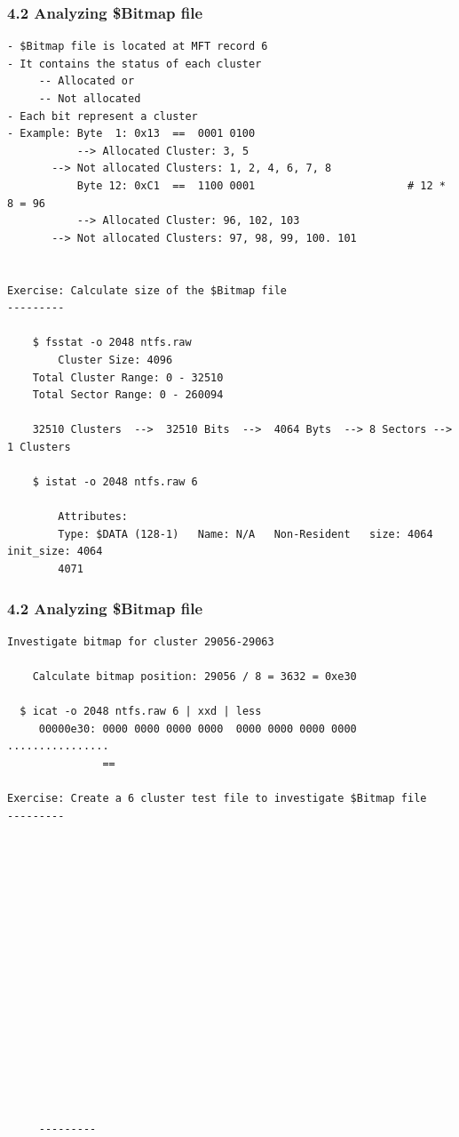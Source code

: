 \begin{frame}[fragile]
  \frametitle{4.2 Analyzing \$Bitmap file}
  \begin{lstlisting}[basicstyle=\tiny]
- $Bitmap file is located at MFT record 6
- It contains the status of each cluster
     -- Allocated or
     -- Not allocated
- Each bit represent a cluster
- Example: Byte  1: 0x13  ==  0001 0100 
           --> Allocated Cluster: 3, 5
	   --> Not allocated Clusters: 1, 2, 4, 6, 7, 8
           Byte 12: 0xC1  ==  1100 0001                        # 12 * 8 = 96
           --> Allocated Cluster: 96, 102, 103
	   --> Not allocated Clusters: 97, 98, 99, 100. 101


Exercise: Calculate size of the $Bitmap file
---------

    $ fsstat -o 2048 ntfs.raw
        Cluster Size: 4096
	Total Cluster Range: 0 - 32510
	Total Sector Range: 0 - 260094

    32510 Clusters  -->  32510 Bits  -->  4064 Byts  --> 8 Sectors --> 1 Clusters

    $ istat -o 2048 ntfs.raw 6

        Attributes:
        Type: $DATA (128-1)   Name: N/A   Non-Resident   size: 4064  init_size: 4064
        4071
  \end{lstlisting}
\end{frame}


\begin{frame}[fragile]
  \frametitle{4.2 Analyzing \$Bitmap file}
  \begin{lstlisting}[basicstyle=\tiny]
Investigate bitmap for cluster 29056-29063

    Calculate bitmap position: 29056 / 8 = 3632 = 0xe30
  
  $ icat -o 2048 ntfs.raw 6 | xxd | less
     00000e30: 0000 0000 0000 0000  0000 0000 0000 0000  ................
               ==

Exercise: Create a 6 cluster test file to investigate $Bitmap file
---------

















     ---------
  \end{lstlisting}
\end{frame}


